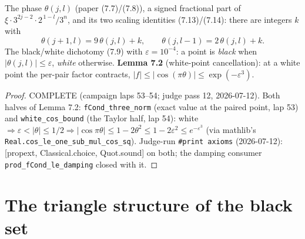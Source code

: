 \begin{lemma}\label{X2}
  \leanok
The phase \(\theta(j,l)\) (paper (7.7)/(7.8)), a signed fractional part of
\(\xi\cdot 3^{2j-2}\cdot 2^{\,1-l}/3^n\), and its two scaling identities (7.13)/(7.14): there
are integers \(k\) with
\[
  \theta(j{+}1,l) = 9\,\theta(j,l) + k, \qquad \theta(j,l{-}1) = 2\,\theta(j,l) + k .
\]
The black/white dichotomy (7.9) with \(\varepsilon = 10^{-4}\): a point is \emph{black} when
\(|\theta(j,l)|\le\varepsilon\), \emph{white} otherwise.  \textbf{Lemma 7.2} (white-point
cancellation): at a white point the per-pair factor contracts,
\(|f| \le |\cos(\pi\theta)| \le \exp(-\varepsilon^3)\).
\end{lemma}
\begin{proof}
  \leanok
COMPLETE (campaign laps 53--54; judge pass 12, 2026-07-12).  Both halves of Lemma 7.2:
\texttt{fCond\_three\_norm} (exact value at the paired point, lap 53) and
\texttt{white\_cos\_bound} (the Taylor half, lap 54): white \(\Rightarrow \varepsilon <
|\theta| \le 1/2 \Rightarrow |\cos\pi\theta| \le 1 - 2\theta^2 \le 1 - 2\varepsilon^2 \le
e^{-\varepsilon^3}\) (via mathlib's \texttt{Real.cos\_le\_one\_sub\_mul\_cos\_sq}).
Judge-run \texttt{\#print axioms} (2026-07-12): [propext, Classical.choice, Quot.sound]
on both; the damping consumer \texttt{prod\_fCond\_le\_damping} closed with it.
\end{proof}

\section{The triangle structure of the black set}

